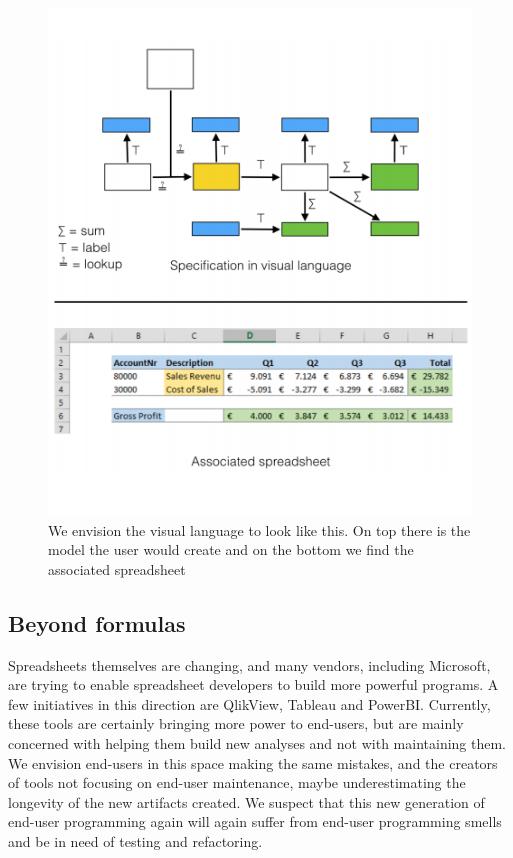 \documentclass[conference]{IEEEtran}
\begin{document}
\begin{figure}
  \begin{center}
  \includegraphics[width=\columnwidth]{fig/visualLanguage.png}
  \caption{We envision the visual language to look like this. On top there is the model the user would create and on the bottom we find the associated spreadsheet}
  \label{fig:visualLanguage}
  \end{center}
\end{figure} 


\subsection{Beyond formulas}
Spreadsheets themselves are changing, and many vendors, including Microsoft, are trying to enable spreadsheet developers to build more powerful programs. A few initiatives in this direction are QlikView, Tableau and PowerBI. Currently, these tools are certainly bringing more power to end-users, but are mainly concerned with helping them build new analyses and not with maintaining them. We envision end-users in this space making the same mistakes, and the creators of tools not focusing on end-user maintenance, maybe underestimating the longevity of the new artifacts created. We suspect that this new generation of end-user programming again will again suffer from end-user programming smells and be in need of testing and refactoring.
\end{document}
